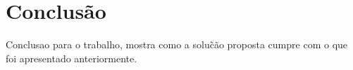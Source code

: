 \newpage
\chapter{Conclus\~ao}
\par Conclusao para o trabalho, mostra como a solu\~c\~ao proposta cumpre com o que foi apresentado anteriormente.